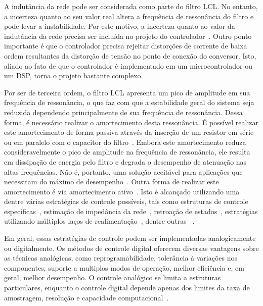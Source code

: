	A indutância da rede pode ser considerada como parte do filtro LCL. No entanto,
	a incerteza quanto ao seu valor real altera a frequência de ressonância do
	filtro e pode levar a instabilidade. Por este motivo, a incerteza quanto ao
	valor da indutância da rede precisa ser incluída no projeto do
	controlador~\cite{ref:LISERRE}. Outro ponto importante é que o controlador
	precisa rejeitar distorções de corrente de baixa ordem resultantes da
	distorção de tensão no ponto de conexão do conversor. Isto, aliado ao fato de
	que o controlador é implementado em um microcontrolador ou um DSP, torna o
	projeto bastante complexo.

	Por ser de terceira ordem, o filtro LCL apresenta um pico de amplitude em
	sua frequência de ressonância, o que faz com que a estabilidade geral do
	sistema seja reduzida dependendo principalmente de sua frequência de
	ressonância. Dessa forma, é necessário realizar o amortecimento desta
	ressonância. É possível realizar este amortecimento de forma passiva
	através da inserção	de um resistor em série ou em paralelo com o capacitor
	do filtro~\cite{ref:AHMED}. Embora este amortecimento reduza consideravelmente
	o pico de amplitude na frequência de ressonância, ele resulta em dissipação de
	energia pelo filtro e degrada o desempenho de atenuação nas altas frequências. Não é,
	portanto, uma solução aceitável para aplicações que necessitam do máximo de
	desempenho~\cite{ref:SHEN}. Outra forma de realizar este amortecimento é via
	amortecimento ativo~\cite{ref:GERVASIO}. Isto é alcançado utilizando uma dentre
	várias estratégias de controle possíveis, tais como estruturas de controle
	específicas~\cite{ref:WU}, estimação de impedância da rede~\cite{ref:BLAABJERG},
	retroação de estados~\cite{ref:MASSING}, estratégias utilizando múltiplos laços de
	realimentação~\cite{ref:POH}, dentre outras~\cite{ref:WESSELS} \cite{ref:MORENO}
	\cite{ref:YANG}.

	Em geral, essas estratégias de controle podem ser implementadas analogicamente ou
	digitalmente. Os métodos de controle digital oferecem diversas vantagens sobre
	as técnicas analógicas, como reprogramabilidade, tolerância à variações
	nos componentes, suporte a multiplos modos de operação, melhor eficiência e,
	em geral, melhor desempenho. O controle analógico se limita a estruturas particulares,
	enquanto o controle digital depende apenas dos limites da taxa de amostragem,
	resolução e capacidade computacional~\cite{ref:KIMBALL}.

